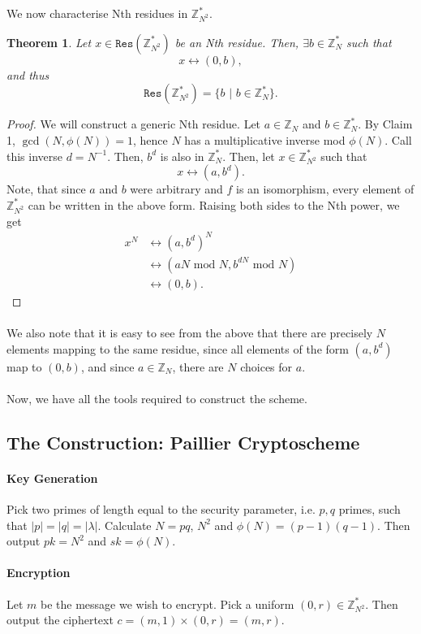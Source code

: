 \documentclass{article}
\newtheorem{theorem}{Theorem}[section]
\theoremstyle{definition}
\newcommand{\Int}{\mathbb{Z}}
\renewcommand{\mod}{\,\,\text{mod}\,\,}
\begin{document}
We now characterise Nth residues in $\Int_{N^2}^*$.
\begin{theorem}
  Let $x \in \texttt{Res}(\Int_{N^2}^*)$ be an Nth residue. Then, $\exists b \in
  \Int_N^*$ such that
  \[
    x \leftrightarrow (0, b),
  \]
  and thus
  \[
    \texttt{Res}(\Int_{N^2}^*) = \{b \,\,|\,\, b \in \Int_N^*\}.
  \]
\end{theorem}
\begin{proof}
  We will construct a generic Nth residue. Let $a \in \Int_N$ and $b \in
  \Int_N^*$. By Claim 1, $\gcd(N, \phi(N)) = 1$, hence $N$ has a multiplicative
  inverse mod $\phi(N)$. Call this inverse $d = N^{-1}$. Then, $b^d$ is also in $\Int_N^*$. Then, let $x \in \Int_{N^2}^*$ such
  that
  \[
    x \leftrightarrow (a, b^d).
  \] 
  Note, that since $a$ and $b$ were arbitrary and $f$ is an isomorphism, every
  element of $\Int_{N^2}^*$ can be written in the above form. Raising both sides
  to the Nth power, we get
  \begin{align*}
    x^N &\leftrightarrow (a, b^d)^N \\
        &\leftrightarrow (aN \mod N, b^{dN} \mod N) \\
        &\leftrightarrow (0, b).
  \end{align*}
\end{proof}
\paragraph{} We also note that it is easy to see from the above that there are
precisely $N$ elements mapping to the same residue, since all elements of the
form $(a, b^d)$ map to $(0, b)$, and since $a\in \Int_N$, there are $N$ choices
for $a$.
\paragraph{} Now, we have all the tools required to construct the scheme.
\subsection{The Construction: Paillier Cryptoscheme}
\paragraph{Key Generation}
Pick two primes of length equal to the security parameter, i.e. $p, q$ primes,
such that $|p| = |q| = |\lambda|$. Calculate $N = pq$, $N^2$ and $\phi(N) = (p -
1)(q - 1)$.
Then output $pk = N^2$ and $sk = \phi(N)$.
\paragraph{Encryption}
Let $m$ be the message we wish to encrypt. Pick a uniform $(0, r) \in
\Int_{N^2}^*$. Then output the ciphertext $c = (m, 1) \times (0, r) = (m, r)$.
\end{document}
